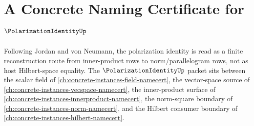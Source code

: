 \chapter{A Concrete Naming Certificate for $\PolarizationIdentityUp$}
\label{ch:concrete-instances-polarization-identity-namecert}

Following Jordan and von Neumann, the polarization identity is read as a finite reconstruction route from inner-product rows to norm/parallelogram rows, not as host Hilbert-space equality. The $\PolarizationIdentityUp$ packet sits between the scalar field of \autoref{ch:concrete-instances-field-namecert}, the vector-space source of \autoref{ch:concrete-instances-vecspace-namecert}, the inner-product surface of \autoref{ch:concrete-instances-innerproduct-namecert}, the norm-square boundary of \autoref{ch:concrete-instances-norm-namecert}, and the Hilbert consumer boundary of \autoref{ch:concrete-instances-hilbert-namecert}.

